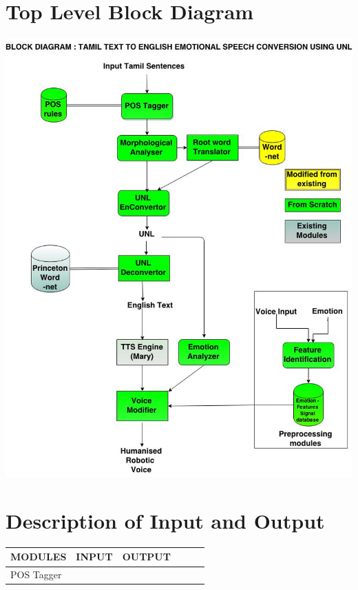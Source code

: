 \documentclass{article}
\begin{document}
\section{Top Level Block Diagram}\large
\includegraphics[width=\textwidth]{block}
\section{Description of Input and Output}\large
\begin{center}
\begin{tabularx}{\linewidth}{|@{}lYYYYY@{}|}
\hline\hline
MODULES & INPUT & OUTPUT\\
\hline
POS Tagger & 
\end {tabularx}
\end{center}
\end{document}
